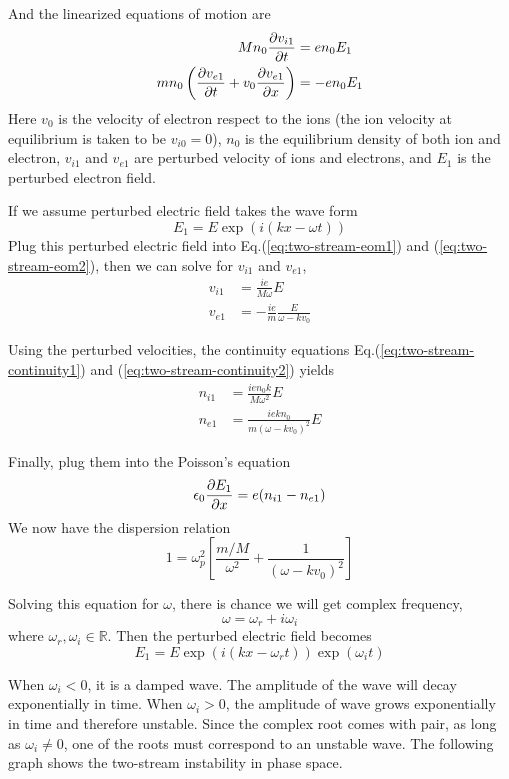 And the linearized equations of motion are
\begin{align} 
	Mn_0\pdv{v_{i1}}{t} &= en_0E_1  \label{eq:two-stream-eom1} \\
	mn_0\left(\pdv{v_{e1}}{t} + v_0\pdv{v_{e1}}{x}\right) &= -en_0E_1 \label{eq:two-stream-eom2}
\end{align}
Here $v_0$ is the velocity of electron respect to the ions (the ion velocity at equilibrium is taken to be $v_{i0}=0$), $n_0$ is the equilibrium density of both ion and electron, $v_{i1}$ and $v_{e1}$ are perturbed velocity of ions and electrons, and $E_1$ is the perturbed electron field.

If we assume perturbed electric field takes the wave form
\[ E_1 = E\exp(i(kx-\omega t)) \]
Plug this perturbed electric field into Eq.(\ref{eq:two-stream-eom1}) and (\ref{eq:two-stream-eom2}), then we can solve for $v_{i1}$ and $v_{e1}$,
\begin{align*}
	v_{i1} &= \frac{ie}{M\omega} E \\
	v_{e1} &= -\frac{ie}{m}\frac{E}{\omega-kv_0}
\end{align*}

Using the perturbed velocities, the continuity equations Eq.(\ref{eq:two-stream-continuity1}) and (\ref{eq:two-stream-continuity2}) yields
\begin{align*}
	n_{i1} &= \frac{ien_0k}{M\omega^2} E \\
	n_{e1} &= \frac{iekn_0}{m(\omega-kv_0)^2}E
\end{align*}

Finally, plug them into the Poisson's equation
\[ \epsilon_0 \pdv{E_1}{x} = e(n_{i1}-n_{e1}) \]
We now have the dispersion relation
\[ 1 = \omega_p^2 \left[\frac{m/M}{\omega^2}+\frac{1}{(\omega-kv_0)^2}\right] \]

Solving this equation for $\omega$, there is chance we will get complex frequency,
\[ \omega = \omega_r + i\omega_i \]
where $\omega_r, \omega_i \in\mathbb{R}$. Then the perturbed electric field becomes
\[ E_1 = E\exp(i(kx-\omega_rt))\exp(\omega_it) \]

When $\omega_i < 0$, it is a damped wave. The amplitude of the wave will decay exponentially in time. When $\omega_i > 0$, the amplitude of wave grows exponentially in time and therefore unstable. Since the complex root comes with pair, as long as $\omega_i\neq 0$, one of the roots must correspond to an unstable wave. The following graph shows the two-stream instability in phase space.

